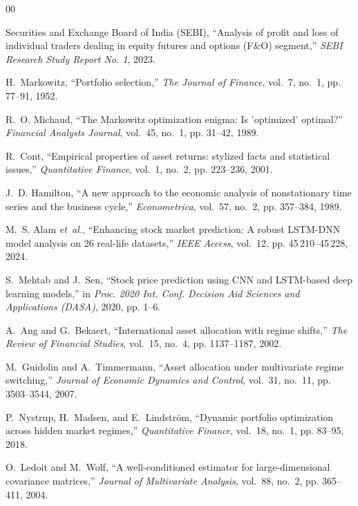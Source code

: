 \documentclass[conference]{IEEEtran}
\begin{document}
\begin{thebibliography}{00}
\fontsize{8pt}{9.0pt}\selectfont
\setlength{\itemsep}{0pt plus 0.2pt}
\setlength{\parskip}{0pt}

{Securities and Exchange Board of India (SEBI)}, ``Analysis of profit and loss of individual traders dealing in equity futures and options ({F\&O}) segment,'' \emph{SEBI Research Study Report No. 1}, 2023.

H.~Markowitz, ``Portfolio selection,'' \emph{The Journal of Finance}, vol.~7, no.~1, pp. 77--91, 1952.

R.~O. Michaud, ``The Markowitz optimization enigma: Is 'optimized' optimal?'' \emph{Financial Analysts Journal}, vol.~45, no.~1, pp. 31--42, 1989.

R.~Cont, ``Empirical properties of asset returns: stylized facts and statistical issues,'' \emph{Quantitative Finance}, vol.~1, no.~2, pp. 223--236, 2001.

J.~D. Hamilton, ``A new approach to the economic analysis of nonstationary time series and the business cycle,'' \emph{Econometrica}, vol.~57, no.~2, pp. 357--384, 1989.

M.~S. Alam \emph{et~al.}, ``Enhancing stock market prediction: A robust {LSTM-DNN} model analysis on 26 real-life datasets,'' \emph{IEEE Access}, vol.~12, pp. 45\,210--45\,228, 2024.

S.~Mehtab and J.~Sen, ``Stock price prediction using {CNN} and {LSTM}-based deep learning models,'' in \emph{Proc. 2020 Int. Conf. Decision Aid Sciences and Applications (DASA)}, 2020, pp. 1--6.

A.~Ang and G.~Bekaert, ``International asset allocation with regime shifts,'' \emph{The Review of Financial Studies}, vol.~15, no.~4, pp. 1137--1187, 2002.

M.~Guidolin and A.~Timmermann, ``Asset allocation under multivariate regime switching,'' \emph{Journal of Economic Dynamics and Control}, vol.~31, no.~11, pp. 3503--3544, 2007.

P.~Nystrup, H.~Madsen, and E.~Lindstr{\"o}m, ``Dynamic portfolio optimization across hidden market regimes,'' \emph{Quantitative Finance}, vol.~18, no.~1, pp. 83--95, 2018.

O.~Ledoit and M.~Wolf, ``A well-conditioned estimator for large-dimensional covariance matrices,'' \emph{Journal of Multivariate Analysis}, vol.~88, no.~2, pp. 365--411, 2004.


\end{thebibliography}
\end{document}
